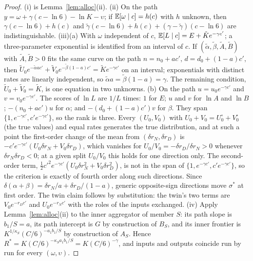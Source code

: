 \begin{proof}
(i) is Lemma~\ref{lem:alloc}(ii). (ii) On the path $y=\omega+\gamma(c-\ln6)-\ln K-\upsilon$; if $\mathbb{E}[\omega\mid c]=h(c)$
with $h$ unknown, then $\gamma(c-\ln6)+h(c)$ and $\tilde\gamma(c-\ln6)+h(c)+(\gamma-\tilde\gamma)(c-\ln6)$ are
indistinguishable. (iii)(a) With $\omega$ independent of $c$, $\mathbb{E}[L\mid c]=E+\tilde Ke^{-\gamma c'}$; a three-parameter
exponential is identified from an interval of $c$. If $(\tilde\alpha,\tilde\beta,\tilde A,\tilde B)$ with $\tilde A,\tilde
B>0$ fits the same curve on the path $n=n_0+ac'$, $d=d_0+(1-a)c'$, then
$\tilde U_0e^{-\tilde\alpha ac'}+\tilde V_0e^{-\tilde\beta(1-a)c'}=\tilde Ke^{-\gamma c'}$ on an interval; exponentials with
distinct rates are linearly independent, so $\tilde\alpha a=\tilde\beta(1-a)=\gamma$. The remaining condition,
$\tilde U_0+\tilde V_0=\tilde K$, is one equation in two unknowns. (b) On the path $u=u_0e^{-\gamma c'}$ and
$v=v_0e^{-\gamma c'}$. The scores of $\ln L$ are $1/L$ times: $1$ for $E$; $u$ and $v$ for $\ln A$ and $\ln B$;
$-(n_0+ac')u$ for $\alpha$; and $-(d_0+(1-a)c')v$ for $\beta$. They span $\{1,e^{-\gamma c'},c'e^{-\gamma c'}\}$, so the rank is
three. Every $(U_0,V_0)$ with $U_0+V_0=U_0^\circ+V_0^\circ$ (the true values) and equal rates generates the true
distribution, and at such a point the first-order change of the mean from $(\delta r_N,\delta r_D)$ is
$-c'e^{-\gamma c'}(U_0\delta r_N+V_0\delta r_D)$, which vanishes for $U_0/V_0=-\delta r_D/\delta r_N>0$ whenever
$\delta r_N\delta r_D<0$; at a given split $U_0/V_0$ this holds for one direction only. The second-order term,
$\tfrac12c'^2e^{-\gamma c'}(U_0\delta r_N^2+V_0\delta r_D^2)$, is not in the span of $\{1,e^{-\gamma c'},c'e^{-\gamma c'}\}$, so
the criterion is exactly of fourth order along such directions. Since $\delta(\alpha+\beta)=\delta r_N/a+\delta r_D/(1-a)$,
generic opposite-sign directions move $\sigma^*$ at first order. The twin claim follows by substitution: the twin's two
terms are $V_0e^{-r_Dc'}$ and $U_0e^{-r_Nc'}$ with the roles of the inputs exchanged. (iv) Apply Lemma~\ref{lem:alloc}(ii) to the
inner aggregator of member $S$: its path slope is $b_1/S=a$, its path intercept is $G$ by construction of $B_S$, and its
inner frontier is $K^{1/\kappa_S}(C/6)^{-a_1b_1/S}$ by construction of $A_S$. Hence $R^*=K(C/6)^{-\kappa_Sa_1b_1/S}=K(C/6)^{-\gamma}$,
and inputs and outputs coincide run by run for every $(\omega,\upsilon)$.
\end{proof}

